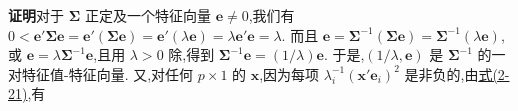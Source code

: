 \noindent\textbf{证明}\quad 对于 $\boldsymbol{\Sigma}$ 正定及一个特征向量 $\mathbf{e}\neq0$,我们有 $0<\mathbf{e}'\boldsymbol{\Sigma}\mathbf{e}=\mathbf{e}'(\boldsymbol{\Sigma}\mathbf{e})=\mathbf{e}'(\lambda\mathbf{e})=\lambda\mathbf{e}'\mathbf{e}=\lambda$. 而且 $\mathbf{e}=\boldsymbol{\Sigma}^{-1}(\boldsymbol{\Sigma}\mathbf{e})=\boldsymbol{\Sigma}^{-1}(\lambda\mathbf{e})$,或 $\mathbf{e}=\lambda\boldsymbol{\Sigma}^{-1}\mathbf{e}$,且用 $\lambda>0$ 除,得到 $\boldsymbol{\Sigma}^{-1}\mathbf{e}=(1/\lambda)\mathbf{e}$. 于是,$(1/\lambda,\mathbf{e})$ 是 $\boldsymbol{\Sigma}^{-1}$ 的一对特征值-特征向量. 又,对任何 $p\times1$ 的 $\mathbf{x}$,因为每项 $\lambda_i^{-1}(\mathbf{x}'\mathbf{e}_i)^{2}$ 是非负的,由\hyperref[eq:2-21]{式(2-21)},有
